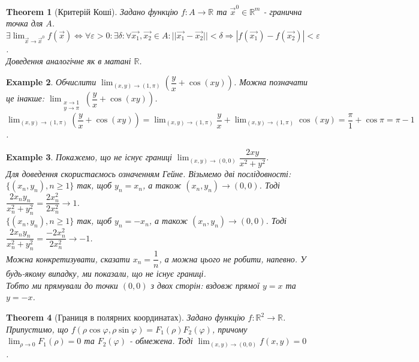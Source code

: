 \documentclass[a4paper, 10pt]{article}
\def\huge{\displaystyle}
\theoremstyle{theoremdd}
\newtheorem{theorem}{Theorem}[subsection]
\theoremstyle{theoremdd}
\theoremstyle{theoremdd}
\theoremstyle{theoremdd}
\theoremstyle{theoremdd}
\newtheorem{example}[theorem]{Example}
\theoremstyle{theoremdd}
\theoremstyle{theoremdd}
\theoremstyle{theoremdd}
\theoremstyle{theoremdd}
\begin{document}
\begin{theorem}[Критерій Коші]
Задано функцію $f: A \to \mathbb{R}$ та $\vec{x}^0 \in \mathbb{R}^m$ - гранична точка для $A$.\\
$\exists \huge \lim_{\vec{x} \to \vec{x}^0} f(\vec{x}) \iff \forall \varepsilon > 0: \exists \delta: \forall \vec{x_1}, \vec{x_2} \in A: ||\vec{x_1} - \vec{x_2} || < \delta \Rightarrow |f(\vec{x_1}) - f(\vec{x_2})| < \varepsilon$.\\
\textit{Доведення аналогічне як в матані $\mathbb{R}$.}
\end{theorem}

\begin{example}
Обчислити $\huge\lim_{(x,y) \to (1,\pi)} \left( \dfrac{y}{x} + \cos (xy) \right)$. Можна позначати це інакше: $\huge\lim_{\substack{x \to 1 \\ y \to \pi}} \left( \dfrac{y}{x} + \cos (xy) \right)$.\\
$\huge\lim_{(x,y) \to (1,\pi)} \left( \dfrac{y}{x} + \cos (xy) \right) = \lim_{(x,y) \to (1,\pi)} \dfrac{y}{x} + \lim_{(x,y) \to (1,\pi)} \cos (xy) = \dfrac{\pi}{1} + \cos \pi = \pi - 1$.
\end{example}

\begin{example}
Покажемо, що не існує границі $\displaystyle\lim_{(x,y) \to (0,0)} \dfrac{2xy}{x^2+y^2}$.\\
Для доведення скористаємось означенням Гейне. Візьмемо дві послідовності:\\
$\{(x_n,y_n), n \geq 1\}$ так, щоб $y_n = x_n$, а також $(x_n,y_n) \to (0,0)$. Тоді $\dfrac{2x_n y_n}{x_n^2+y_n^2} = \dfrac{2x_n^2}{2x_n^2} \to 1$.\\
$\{(x_n,y_n), n \geq 1\}$ так, щоб $y_n = -x_n$, а також $(x_n,y_n) \to (0,0)$. Тоді $\dfrac{2x_n y_n}{x_n^2+y_n^2} = \dfrac{-2x_n^2}{2x_n^2} \to -1$.\\
Можна конкретизувати, сказати $x_n = \dfrac{1}{n}$, а можна цього не робити, напевно. У будь-якому випадку, ми показали, що не існує границі.\\
Тобто ми прямували до точки $(0,0)$ з двох сторін: вздовж прямої $y = x$ та $y = -x$.
\end{example}

\begin{theorem}[Границя в полярних координатах]
Задано функцію $f: \mathbb{R}^2 \to \mathbb{R}$. Припустимо, що $f(\rho \cos \varphi, \rho \sin \varphi) = F_1(\rho) F_2(\varphi)$, причому $\huge\lim_{\rho \to 0} F_1(\rho) = 0$ та $F_2(\varphi)$ - обмежена. Тоді $\huge\lim_{(x,y) \to (0,0)} f(x,y) = 0$.
\end{theorem}
\end{document}
